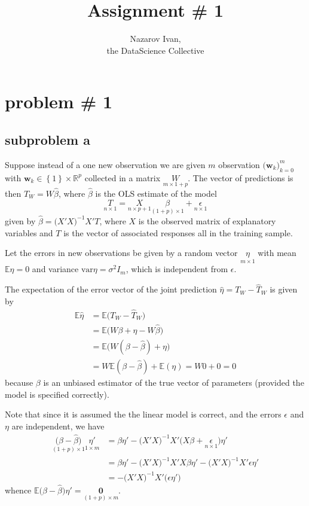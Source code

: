\documentclass[a4paper]{article}
\title{Assignment \# 1}
\author{Nazarov Ivan, \rus{101мНОД(ИССА)}\\the DataScience Collective}
\newcommand{\obj}[1]{{\left\{ #1 \right \}}}
\newcommand{\w}{\mathbf{w}}
\newcommand{\Real}{\mathbb{R}}
\newcommand{\Ex}{\mathbb{E}}
\newcommand{\Var}{\text{var}}
\begin{document}
\maketitle

\section{problem \# 1} %
\label{sec:problem_1}

\subsection{subproblem a} %
\label{sub:subproblem_a}

Suppose instead of a one new observation we are given $m$ observation
$\big(\w_k\big)_{k=0}^m$ with $\w_k\in \obj{1}\times\Real^p$
collected in a matrix $\underset{m\times 1+p}{W}$. The vector of predictions
is then $\hat{T}_W = W\hat{\beta}$, where $\hat{\beta}$ is the OLS estimate of
the model
\[ \underset{n\times 1}{T} = \underset{n\times p+1}{X} \underset{(1+p)\times 1}{\beta} + \underset{n\times 1}{\epsilon}\]
given by $\hat{\beta} = \big(X'X\big)^{-1} X'T$, where $X$ is the observed matrix of explanatory variables and $T$ is the vector of associated responses
all in the training sample.

Let the errors in new observations be given by a random vector $\underset{m\times 1}{\eta}$ with mean $\Ex \eta = 0$ and variance $\Var \eta = \sigma^2 I_m$,
which is independent from $\epsilon$.

The expectation of the error vector of the joint prediction $\hat{\eta} = T_W - \hat{T}_W$ is given by
\begin{align*}
	\Ex \hat{\eta} &= \Ex\Big( T_W - \hat{T}_W \Big) \\
	&= \Ex\Big( W\beta + \eta - W\hat{\beta} \Big) \\
	&= \Ex\Big( W (\beta - \hat{\beta}) + \eta \Big) \\
	&= W \Ex(\beta - \hat{\beta}) + \Ex(\eta) = W 0 + 0 = 0
\end{align*}
because $\beta$ is an unbiased estimator of the true vector of parameters
(provided the model is specified correctly).

Note that since it is assumed the the linear model is correct, and the errors
$\epsilon$ and $\eta$ are independent, we have
\begin{align*}
	\underset{(1+p)\times 1}{\big(\beta-\hat{\beta}\big)}\underset{1\times m}{\eta'}
	&= \beta\eta' - \big(X'X\big)^{-1} X'\big(X\beta + \underset{n\times 1}{\epsilon}) \eta' \\
	&= \beta\eta' - \big(X'X\big)^{-1} X'X\beta\eta' - \big(X'X\big)^{-1} X'\epsilon \eta' \\
	&=  - \big(X'X\big)^{-1} X' \big( \epsilon \eta' \big)
\end{align*}
whence $\Ex \big(\beta-\hat{\beta}\big)\eta' = \underset{(1+p)\times m}{\mathbf{0}}$.
\end{document}
